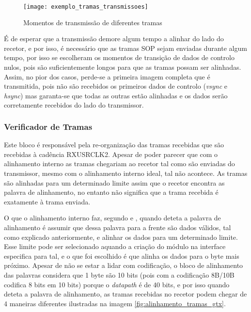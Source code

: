 \begin{figure}[h!]
	\begin{center}
		\leavevmode
		\texttt{[image: exemplo\_tramas\_transmissoes]}
		\captionsetup{width=1.0\linewidth}
		\caption[Momentos de transmissão de diferentes tramas]{Momentos de transmissão de diferentes tramas}
		\label{fig:momentos_tramas}
	\end{center}
\end{figure}

É de esperar que a transmissão demore algum tempo a alinhar do lado do recetor, e por isso, é necessário que as tramas SOP sejam enviadas durante algum tempo, por isso se escolheram os momentos de transição de dados de controlo nulos, pois são suficientemente longos para que as tramas possam ser alinhadas. Assim, no pior dos casos, perde-se a primeira imagem completa que é transmitida, pois não são recebidos os primeiros dados de controlo (\textit{vsync} e \textit{hsync}) mas garanta-se que todas as outras estão alinhadas e os dados serão corretamente recebidos do lado do transmissor.

\subsubsection*{Verificador de Tramas} \label{subsub:serial_frameChecker}
  

Este bloco é responsável pela re-organização das tramas recebidas que são recebidas à cadência RXUSRCLK2. Apesar de poder parecer que com o alinhamento interno as tramas chegariam ao recetor tal como são enviadas do transmissor, mesmo com o alinhamento interno ideal, tal não acontece. As tramas são alinhadas para um determinado limite assim que o recetor encontra as palavra de alinhamento, no entanto não significa que a trama recebida é exatamente à trama enviada. 

O que o alinhamento interno faz, segundo \cite{R022} e \cite{R011}, quando deteta a palavra de alinhamento é assumir que dessa palavra para a frente são dados válidos, tal como explicado anteriormente, e alinhar os dados para um determinado limite. Esse limite pode ser selecionado aquando a criação do módulo na interface especifica para tal, e o que foi escolhido é que alinha os dados para o byte mais próximo. Apesar de não se estar a lidar com codificação, o bloco de alinhamento das palavras considera que 1 byte são 10 bits (pois com a codificação 8B/10B codifica 8 bits em 10 bits) porque o \textit{datapath} é de 40 bits, e por isso quando deteta a palavra de alinhamento, as tramas recebidas no recetor podem chegar de 4 maneiras diferentes ilustradas na imagem \ref{fig:alinhamento_tramas_gtx}.


